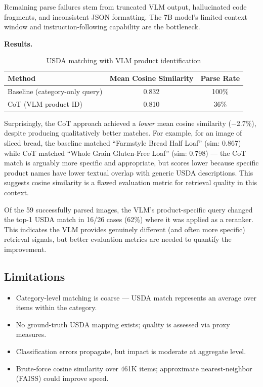 \documentclass[11pt]{article}
\begin{document}
Remaining parse failures stem from truncated VLM output, hallucinated code fragments, and inconsistent JSON formatting. The 7B model's limited context window and instruction-following capability are the bottleneck.

\textbf{Results.}

\begin{table}[h]
\centering
\caption{USDA matching with VLM product identification}
\label{tab:cot_usda}
\begin{tabular}{lcc}
\toprule
Method & Mean Cosine Similarity & Parse Rate \\
\midrule
Baseline (category-only query) & 0.832 & 100\% \\
CoT (VLM product ID) & 0.810 & 36\% \\
\bottomrule
\end{tabular}
\end{table}

Surprisingly, the CoT approach achieved a \textit{lower} mean cosine similarity ($-$2.7\%), despite producing qualitatively better matches. For example, for an image of sliced bread, the baseline matched ``Farmstyle Bread Half Loaf'' (sim: 0.867) while CoT matched ``Whole Grain Gluten-Free Loaf'' (sim: 0.798) --- the CoT match is arguably more specific and appropriate, but scores lower because specific product names have lower textual overlap with generic USDA descriptions. This suggests cosine similarity is a flawed evaluation metric for retrieval quality in this context.

Of the 59 successfully parsed images, the VLM's product-specific query changed the top-1 USDA match in 16/26 cases (62\%) where it was applied as a reranker. This indicates the VLM provides genuinely different (and often more specific) retrieval signals, but better evaluation metrics are needed to quantify the improvement.

\subsection{Limitations}

\begin{itemize}[nosep,leftmargin=1.5em]
  \item Category-level matching is coarse --- USDA match represents an average over items within the category.
  \item No ground-truth USDA mapping exists; quality is assessed via proxy measures.
  \item Classification errors propagate, but impact is moderate at aggregate level.
  \item Brute-force cosine similarity over 461K items; approximate nearest-neighbor (FAISS) could improve speed.
\end{itemize}
\end{document}
